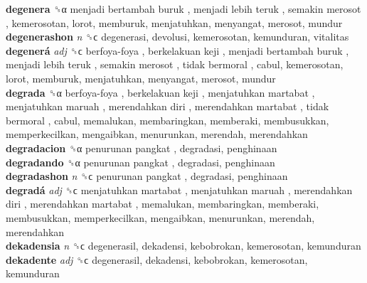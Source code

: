 \textbf{degenera} ␝α   menjadi bertambah buruk ,  menjadi lebih teruk ,  semakin merosot , kemerosotan, lorot, memburuk, menjatuhkan, menyangat, merosot, mundur  \\
\textbf{degenerashon} \emph{n}  ␝ϲ  degenerasi, devolusi, kemerosotan, kemunduran, vitalitas  \\
\textbf{degenerá} \emph{adj}  ␝ϲ   berfoya-foya ,  berkelakuan keji ,  menjadi bertambah buruk ,  menjadi lebih teruk ,  semakin merosot ,  tidak bermoral , cabul, kemerosotan, lorot, memburuk, menjatuhkan, menyangat, merosot, mundur  \\
\textbf{degrada} ␝α   berfoya-foya ,  berkelakuan keji ,  menjatuhkan martabat ,  menjatuhkan maruah ,  merendahkan diri ,  merendahkan martabat ,  tidak bermoral , cabul, memalukan, membaringkan, memberaki, membusukkan, memperkecilkan, mengaibkan, menurunkan, merendah, merendahkan  \\
\textbf{degradacion} ␝α   penurunan pangkat , degradasi, penghinaan  \\
\textbf{degradando} ␝α   penurunan pangkat , degradasi, penghinaan  \\
\textbf{degradashon} \emph{n}  ␝ϲ   penurunan pangkat , degradasi, penghinaan  \\
\textbf{degradá} \emph{adj}  ␝ϲ   menjatuhkan martabat ,  menjatuhkan maruah ,  merendahkan diri ,  merendahkan martabat , memalukan, membaringkan, memberaki, membusukkan, memperkecilkan, mengaibkan, menurunkan, merendah, merendahkan  \\
\textbf{dekadensia} \emph{n}  ␝ϲ  degenerasil, dekadensi, kebobrokan, kemerosotan, kemunduran  \\
\textbf{dekadente} \emph{adj}  ␝ϲ  degenerasil, dekadensi, kebobrokan, kemerosotan, kemunduran  \\
